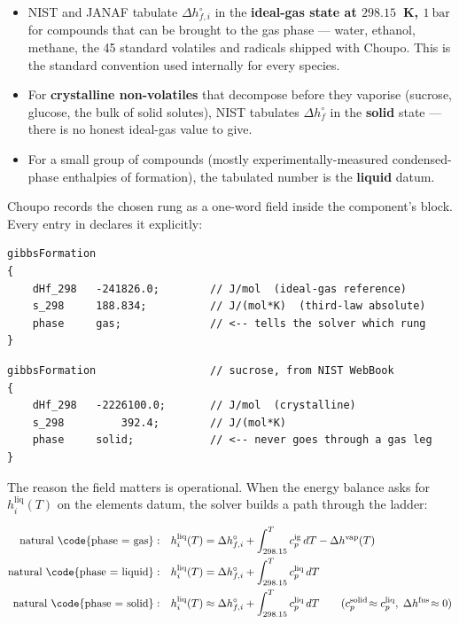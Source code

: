 \documentclass[11pt,a4paper]{article}
\begin{document}
\begin{itemize}[leftmargin=*]
  \item NIST and JANAF tabulate $\Delta h^{\circ}_{f,i}$ in the
        \textbf{ideal-gas state at $298.15$~K, $1~\mathrm{bar}$} for
        compounds that can be brought to the gas phase --- water,
        ethanol, methane, the 45 standard volatiles and radicals
        shipped with Choupo.  This is the standard convention
        used internally for every species.
  \item For \textbf{crystalline non-volatiles} that decompose before
        they vaporise (sucrose, glucose, the bulk of solid solutes),
        NIST tabulates $\Delta h^{\circ}_{f}$ in the \textbf{solid}
        state --- there is no honest ideal-gas value to give.
  \item For a small group of compounds (mostly experimentally-measured
        condensed-phase enthalpies of formation), the tabulated number
        is the \textbf{liquid} datum.
\end{itemize}

Choupo records the chosen rung as a one-word field inside the
component's  block.  Every entry in
 declares it explicitly:

\begin{lstlisting}[language=dict]
gibbsFormation
{
    dHf_298   -241826.0;        // J/mol  (ideal-gas reference)
    s_298     188.834;          // J/(mol*K)  (third-law absolute)
    phase     gas;              // <-- tells the solver which rung
}
\end{lstlisting}

\begin{lstlisting}[language=dict]
gibbsFormation                  // sucrose, from NIST WebBook
{
    dHf_298   -2226100.0;       // J/mol  (crystalline)
    s_298         392.4;        // J/(mol*K)
    phase     solid;            // <-- never goes through a gas leg
}
\end{lstlisting}

The reason the field matters is operational.  When the energy balance
asks for $h_i^{\mathrm{liq}}(T)$ on the elements datum, the solver
builds a path through the ladder:

\begin{align*}
   \text{natural \code{phase = gas}}: &\quad
       h_i^{\mathrm{liq}}(T) = \Delta h^{\circ}_{f,i}
        + \int_{298.15}^{T} c_p^{\mathrm{ig}}\,dT
        - \Delta h^{\mathrm{vap}}(T) \\
   \text{natural \code{phase = liquid}}: &\quad
       h_i^{\mathrm{liq}}(T) = \Delta h^{\circ}_{f,i}
        + \int_{298.15}^{T} c_p^{\mathrm{liq}}\,dT \\
   \text{natural \code{phase = solid}}: &\quad
       h_i^{\mathrm{liq}}(T) \approx \Delta h^{\circ}_{f,i}
        + \int_{298.15}^{T} c_p^{\mathrm{liq}}\,dT
        \qquad (c_p^{\mathrm{solid}}\!\approx c_p^{\mathrm{liq}},\;
                \Delta h^{\mathrm{fus}}\!\approx 0)
\end{align*}
\end{document}
